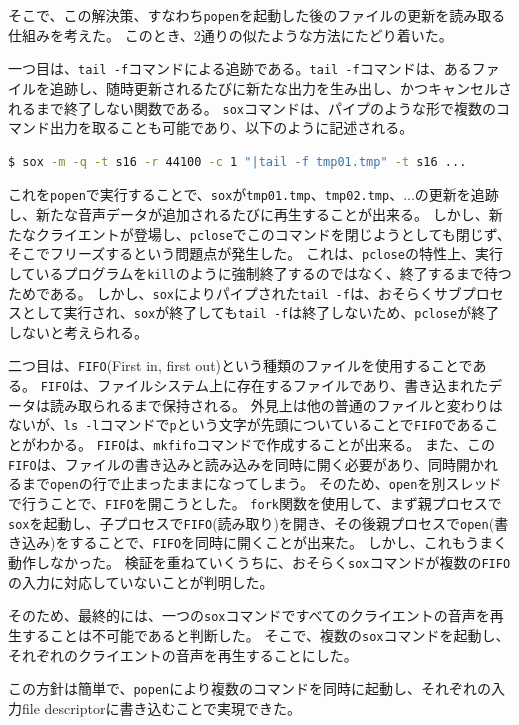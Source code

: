 \documentclass[a4paper]{ltjsarticle}
\begin{document}
そこで、この解決策、すなわち\verb|popen|を起動した後のファイルの更新を読み取る仕組みを考えた。
このとき、2通りの似たような方法にたどり着いた。

一つ目は、\verb|tail -f|コマンドによる追跡である\cite{tail command}。\verb|tail -f|コマンドは、あるファイルを追跡し、随時更新されるたびに新たな出力を生み出し、かつキャンセルされるまで終了しない関数である。
\verb|sox|コマンドは、パイプのような形で複数のコマンド出力を取ることも可能であり、以下のように記述される。
\begin{lstlisting}[language=bash]
    $ sox -m -q -t s16 -r 44100 -c 1 "|tail -f tmp01.tmp" -t s16 ...
\end{lstlisting}
これを\verb|popen|で実行することで、\verb|sox|が\verb|tmp01.tmp|、\verb|tmp02.tmp|、...の更新を追跡し、新たな音声データが追加されるたびに再生することが出来る。
しかし、新たなクライエントが登場し、\verb|pclose|でこのコマンドを閉じようとしても閉じず、そこでフリーズするという問題点が発生した。
これは、\verb|pclose|の特性上、実行しているプログラムを\verb|kill|のように強制終了するのではなく、終了するまで待つためである。
しかし、\verb|sox|によりパイプされた\verb|tail -f|は、おそらくサブプロセスとして実行され、\verb|sox|が終了しても\verb|tail -f|は終了しないため、\verb|pclose|が終了しないと考えられる。

二つ目は、\verb|FIFO|(First in, first out)という種類のファイルを使用することである。
\verb|FIFO|は、ファイルシステム上に存在するファイルであり、書き込まれたデータは読み取られるまで保持される\cite{fifo command}。
外見上は他の普通のファイルと変わりはないが、\verb|ls -l|コマンドで\verb|p|という文字が先頭についていることで\verb|FIFO|であることがわかる。
\verb|FIFO|は、\verb|mkfifo|コマンドで作成することが出来る。
また、この\verb|FIFO|は、ファイルの書き込みと読み込みを同時に開く必要があり、同時開かれるまで\verb|open|の行で止まったままになってしまう。
そのため、\verb|open|を別スレッドで行うことで、\verb|FIFO|を開こうとした。
\verb|fork|関数を使用して、まず親プロセスで\verb|sox|を起動し、子プロセスで\verb|FIFO|(読み取り)を開き、その後親プロセスで\verb|open|(書き込み)をすることで、\verb|FIFO|を同時に開くことが出来た。
しかし、これもうまく動作しなかった。
検証を重ねていくうちに、おそらく\verb|sox|コマンドが複数の\verb|FIFO|の入力に対応していないことが判明した。

そのため、最終的には、一つの\verb|sox|コマンドですべてのクライエントの音声を再生することは不可能であると判断した。
そこで、複数の\verb|sox|コマンドを起動し、それぞれのクライエントの音声を再生することにした。

この方針は簡単で、\verb|popen|により複数のコマンドを同時に起動し、それぞれの入力file descriptorに書き込むことで実現できた。
\end{document}
